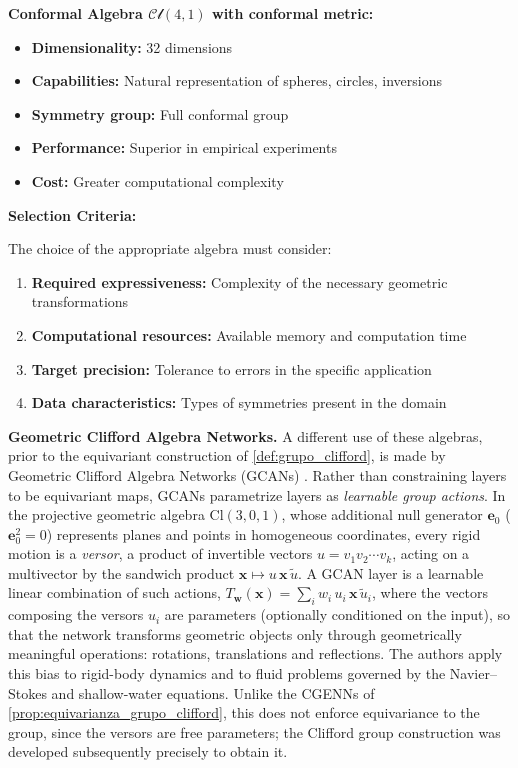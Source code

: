 \textbf{Conformal Algebra $\mathcal{Cl}(4,1)$ with conformal metric:}
\begin{itemize}
    \item \textbf{Dimensionality:} 32 dimensions
    \item \textbf{Capabilities:} Natural representation of spheres, circles, inversions
    \item \textbf{Symmetry group:} Full conformal group
    \item \textbf{Performance:} Superior in empirical experiments
    \item \textbf{Cost:} Greater computational complexity
\end{itemize}

\textbf{Selection Criteria:}

The choice of the appropriate algebra must consider:
\begin{enumerate}
    \item \textbf{Required expressiveness:} Complexity of the necessary geometric transformations
    \item \textbf{Computational resources:} Available memory and computation time
    \item \textbf{Target precision:} Tolerance to errors in the specific application
    \item \textbf{Data characteristics:} Types of symmetries present in the domain
\end{enumerate}

\textbf{Geometric Clifford Algebra Networks.} A different use of these algebras, prior to the equivariant construction of \autoref{def:grupo_clifford}, is made by Geometric Clifford Algebra Networks (GCANs) \citep{ruhe2023geometriccliffordnets}. Rather than constraining layers to be equivariant maps, GCANs parametrize layers as \emph{learnable group actions}. In the projective geometric algebra $\text{Cl}(3,0,1)$, whose additional null generator $\mathbf{e}_0$ ($\mathbf{e}_0^2 = 0$) represents planes and points in homogeneous coordinates, every rigid motion is a \emph{versor}, a product of invertible vectors $u = v_1 v_2 \cdots v_k$, acting on a multivector by the sandwich product $\mathbf{x} \mapsto u\,\mathbf{x}\,\tilde{u}$. A GCAN layer is a learnable linear combination of such actions, $T_{\mathbf{w}}(\mathbf{x}) = \sum_i w_i\, u_i\,\mathbf{x}\,\tilde{u}_i$, where the vectors composing the versors $u_i$ are parameters (optionally conditioned on the input), so that the network transforms geometric objects only through geometrically meaningful operations: rotations, translations and reflections. The authors apply this bias to rigid-body dynamics and to fluid problems governed by the Navier--Stokes and shallow-water equations. Unlike the CGENNs of \autoref{prop:equivarianza_grupo_clifford}, this does not enforce equivariance to the group, since the versors are free parameters; the Clifford group construction was developed subsequently precisely to obtain it.

